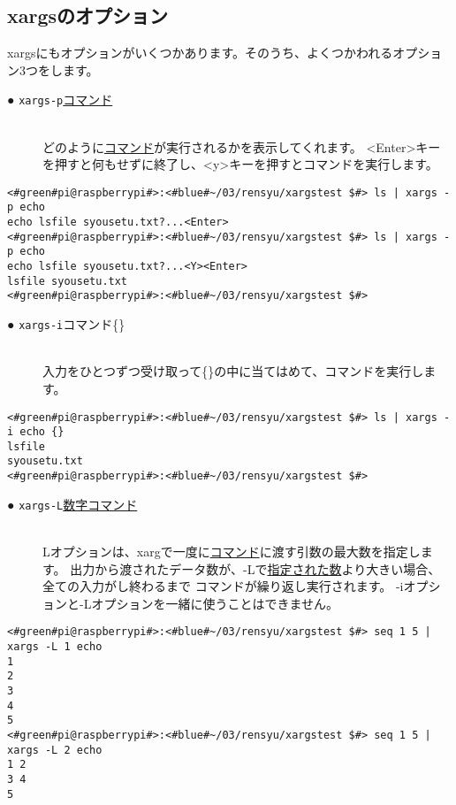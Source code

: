 \subsection{xargsのオプション}
xargsにもオプションがいくつかあります。そのうち、よくつかわれるオプション3つをします。

\begin{description}
    \item[● \texttt{xargs}\textvisiblespace \texttt{-p}\textvisiblespace \underline{コマンド}]\mbox{}\\
    どのように\underline{コマンド}が実行されるかを表示してくれます。
    <Enter>キーを押すと何もせずに終了し、<y>キーを押すとコマンドを実行します。
\end{description}

\begin{lstlisting}[caption=xargsコマンドのオプションp]
<#green#pi@raspberrypi#>:<#blue#~/03/rensyu/xargstest $#> ls | xargs -p echo
echo lsfile syousetu.txt?...<Enter>
<#green#pi@raspberrypi#>:<#blue#~/03/rensyu/xargstest $#> ls | xargs -p echo
echo lsfile syousetu.txt?...<Y><Enter>
lsfile syousetu.txt
<#green#pi@raspberrypi#>:<#blue#~/03/rensyu/xargstest $#>
\end{lstlisting}

\begin{description}
    \item[● \texttt{xargs}\textvisiblespace \texttt{-i}\textvisiblespace コマンド\textvisiblespace \{\}]\mbox{}\\
    入力をひとつずつ受け取って\{\}の中に当てはめて、コマンドを実行します。
\end{description}

\begin{lstlisting}[caption=xargsコマンドのオプションi]
<#green#pi@raspberrypi#>:<#blue#~/03/rensyu/xargstest $#> ls | xargs -i echo {}
lsfile
syousetu.txt
<#green#pi@raspberrypi#>:<#blue#~/03/rensyu/xargstest $#>
\end{lstlisting}
\newpage
\begin{description}
    \item[● \texttt{xargs}\textvisiblespace \texttt{-L}\textvisiblespace\underline{数字}\textvisiblespace\underline{コマンド}]\mbox{}\\
    Lオプションは、xargで一度に\underline{コマンド}に渡す引数の最大数を指定します。
    出力から渡されたデータ数が、-Lで\underline{指定された数}より大きい場合、全ての入力がし終わるまで
    コマンドが繰り返し実行されます。
    -iオプションと-Lオプションを一緒に使うことはできません。
\end{description}
\begin{lstlisting}[caption=xargsコマンドのオプションL]
<#green#pi@raspberrypi#>:<#blue#~/03/rensyu/xargstest $#> seq 1 5 | xargs -L 1 echo
1
2
3
4
5
<#green#pi@raspberrypi#>:<#blue#~/03/rensyu/xargstest $#> seq 1 5 | xargs -L 2 echo
1 2
3 4
5
\end{lstlisting}

